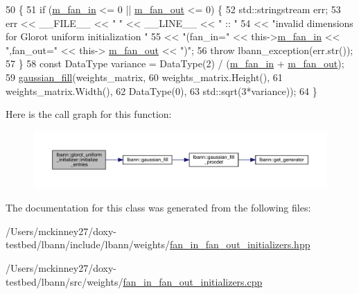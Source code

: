 \begin{DoxyCode}
50                                                                                     \{
51   \textcolor{keywordflow}{if} (\hyperlink{classlbann_1_1fan__in__fan__out__initializer_aea6639db271d9050f0a2e4f8c8dfa6cd}{m\_fan\_in} <= 0 || \hyperlink{classlbann_1_1fan__in__fan__out__initializer_ac67d275ab8574780525d2af59b738338}{m\_fan\_out} <= 0) \{
52     std::stringstream err;
53     err << \_\_FILE\_\_ << \textcolor{stringliteral}{" "} << \_\_LINE\_\_ << \textcolor{stringliteral}{" :: "}
54         << \textcolor{stringliteral}{"invalid dimensions for Glorot uniform initialization "}
55         << \textcolor{stringliteral}{"(fan\_in="} << this->\hyperlink{classlbann_1_1fan__in__fan__out__initializer_aea6639db271d9050f0a2e4f8c8dfa6cd}{m\_fan\_in} << \textcolor{stringliteral}{",fan\_out="} << this->
      \hyperlink{classlbann_1_1fan__in__fan__out__initializer_ac67d275ab8574780525d2af59b738338}{m\_fan\_out} << \textcolor{stringliteral}{")"};
56     \textcolor{keywordflow}{throw} lbann\_exception(err.str());
57   \}
58   \textcolor{keyword}{const} DataType variance = DataType(2) / (\hyperlink{classlbann_1_1fan__in__fan__out__initializer_aea6639db271d9050f0a2e4f8c8dfa6cd}{m\_fan\_in} + \hyperlink{classlbann_1_1fan__in__fan__out__initializer_ac67d275ab8574780525d2af59b738338}{m\_fan\_out});
59   \hyperlink{namespacelbann_abd116f95f55d0e29d9a0cc386139c4b4}{gaussian\_fill}(weights\_matrix,
60                 weights\_matrix.Height(),
61                 weights\_matrix.Width(),
62                 DataType(0),
63                 std::sqrt(3*variance));
64 \}
\end{DoxyCode}
Here is the call graph for this function\+:\nopagebreak
\begin{figure}[H]
\begin{center}
\leavevmode
\includegraphics[width=350pt]{classlbann_1_1glorot__uniform__initializer_a3a44410934f791cee272183a6a36ae0c_cgraph}
\end{center}
\end{figure}


The documentation for this class was generated from the following files\+:\begin{DoxyCompactItemize}
\item 
/\+Users/mckinney27/doxy-\/testbed/lbann/include/lbann/weights/\hyperlink{fan__in__fan__out__initializers_8hpp}{fan\+\_\+in\+\_\+fan\+\_\+out\+\_\+initializers.\+hpp}\item 
/\+Users/mckinney27/doxy-\/testbed/lbann/src/weights/\hyperlink{fan__in__fan__out__initializers_8cpp}{fan\+\_\+in\+\_\+fan\+\_\+out\+\_\+initializers.\+cpp}\end{DoxyCompactItemize}
